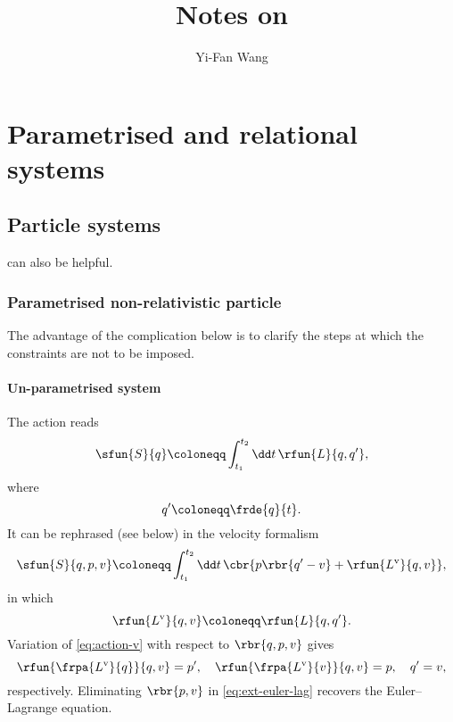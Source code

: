 \documentclass[a4paper]{article}
\title{Notes on \cite{Kiefer_2012}}
\author{Yi-Fan Wang}
\begin{document}
\maketitle


\tableofcontents

\section{Parametrised and relational systems}

\subsection{Particle systems}

\cite{Gitman_1990,Prokhorov_2009,Rothe_2010} can also be helpful.

\subsubsection{Parametrised non-relativistic particle}

The advantage of the complication below is to clarify the steps at which the 
constraints are not to be imposed.

\paragraph{Un-parametrised system}

The action reads
\begin{equation}
\sfun{S}{q} \coloneqq \int_{t_1}^{t_2}\dd t\,\rfun{L}{q, q'},
\label{eq:action-ori}
\end{equation}
where
\begin{equation}
q' \coloneqq \frde{q}{t}.
\end{equation}
It can be rephrased (see below) in the velocity formalism 
\cite[ch.~2]{Gitman_1990}
\begin{equation}
\sfun{S}{q, p, v} \coloneqq \int_{t_1}^{t_2}\dd t\,\cbr{p\rbr{q'-v}+
\rfun{L^\text{v}}{q, v}},
\label{eq:action-v}
\end{equation}
in which
\begin{equation}
\rfun{L^\text{v}}{q, v} \coloneqq \rfun{L}{q, q'}.
\end{equation}
Variation of \cref{eq:action-v} with respect to $\rbr{q, p, v}$ gives
\begin{equation}
\rfun{\frpa{L^\text{v}}{q}}{q, v} = p',\quad
\rfun{\frpa{L^\text{v}}{v}}{q, v} = p,\quad
q' = v,
\label{eq:ext-euler-lag}
\end{equation}
respectively. Eliminating $\rbr{p, v}$ in \cref{eq:ext-euler-lag} recovers the 
Euler--Lagrange equation.
\end{document}

